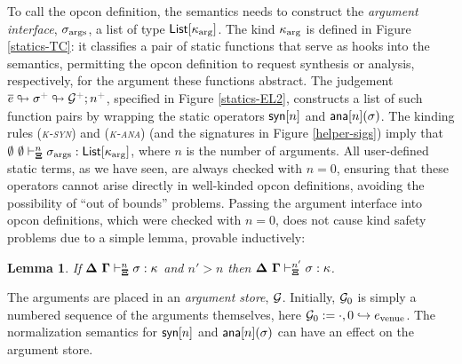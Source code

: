 \documentclass[9pt,preprint]{sigplanconf}
\newcommand{\rulename}[1]{({\textsc{\textsl{#1}}})}
\newcommand{\moutput}{^{\color{gray}{+}}}
\newtheorem{lemma}{Lemma}
\begin{document}
To call the opcon definition, the semantics needs to construct the \emph{argument interface}, $\sigma_\text{args}$, a list of type ${\sf List}[\kappa_\text{arg}]$. %
The kind $\kappa_\text{arg}$ is defined in Figure \ref{statics-TC}: it classifies a pair of static functions that serve as hooks into the semantics, permitting the opcon definition to request synthesis or analysis, respectively, for the argument these functions abstract.  The judgement $\mkargs{\es}{\st\moutput}{\memG\moutput}{n\moutput}$, specified in Figure \ref{statics-EL2}, constructs a list of such function pairs by wrapping the static operators ${\sf syn}[n]$ and ${\sf ana}[n](\sigma)$. The kinding rules \rulename{k-syn} and \rulename{k-ana} (and the signatures in Figure \ref{helper-sigs}) imply that $\emptyset~\emptyset \vdash_{\boldsymbol\Xi}^{n} \sigma_\text{args} : {\sf List}[\kappa_\text{arg}]$, where $n$ is the number of arguments. All user-defined static terms, as we have seen, are always checked with $n=0$, ensuring that these operators cannot arise directly in well-kinded opcon definitions,  avoiding the possibility of ``out of bounds'' problems. Passing the argument interface into opcon definitions, which were checked with $n=0$, does not cause kind safety problems due to a simple lemma, provable inductively:
\begin{lemma}
If $\boldsymbol\Delta~\boldsymbol\Gamma \vdash_{\boldsymbol\Xi}^{n} \sigma : \kappa$ and $n' > n$ then $\boldsymbol\Delta~\boldsymbol\Gamma \vdash_{\boldsymbol\Xi}^{n'} \sigma : \kappa$.
\end{lemma}

The arguments are placed in an \emph{argument store}, $\mathcal{G}$. Initially, $\mathcal{G}_0$ is simply a numbered sequence of the arguments themselves, here $\mathcal{G}_0 := \cdot, 0 \hookrightarrow e_\text{venue}$. The normalization semantics for ${\sf syn}[n]$ and ${\sf ana}[n](\sigma)$ can have an effect on the argument store. 
\end{document}
